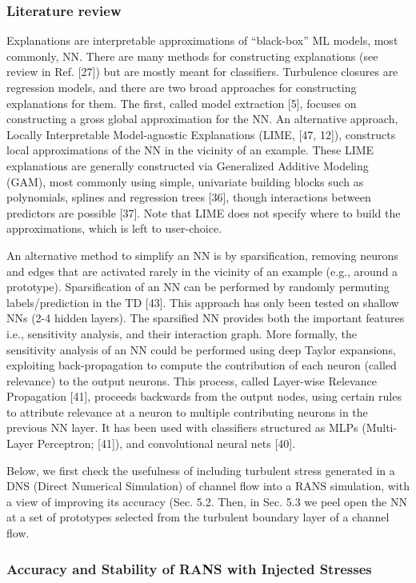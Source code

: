 \subsubsection{Literature review}
Explanations are interpretable approximations of “black-box” ML models, most
commonly, NN. There are many methods for constructing explanations (see review in Ref. [27]) but are
mostly meant for classiﬁers. Turbulence closures are regression models, and there are two broad
approaches for constructing explanations for them. The ﬁrst, called model extraction [5], focuses on
constructing a gross global approximation for the NN. An alternative approach, Locally Interpretable
Model-agnostic Explanations (LIME, [47, 12]), constructs local approximations of the NN in the vicinity
of an example. These LIME explanations are generally constructed via Generalized Additive Modeling
(GAM), most commonly using simple, univariate building blocks such as polynomials, splines and
regression trees [36], though interactions between predictors are possible [37]. Note that LIME does not
specify where to build the approximations, which is left to user-choice.

An alternative method to simplify an NN is by sparsiﬁcation, removing neurons and edges that are
activated rarely in the vicinity of an example (e.g., around a prototype). Sparsiﬁcation of an NN can be
performed by randomly permuting labels/prediction in the TD [43]. This approach has only been tested on
shallow NNs (2-4 hidden layers). The sparsiﬁed NN provides both the important features i.e., sensitivity
analysis, and their interaction graph. More formally, the sensitivity analysis of an NN could be performed
using deep Taylor expansions, exploiting back-propagation to compute the contribution of each neuron
(called relevance) to the output neurons. This process, called Layer-wise Relevance Propagation [41],
proceeds backwards from the output nodes, using certain rules to attribute relevance at a neuron to multiple
contributing neurons in the previous NN layer. It has been used with classiﬁers structured as MLPs
(Multi-Layer Perceptron; [41]), and convolutional neural nets [40].

Below, we ﬁrst check the usefulness of including turbulent stress generated in a DNS (Direct Numerical
Simulation) of channel ﬂow into a RANS simulation, with a view of improving its accuracy (Sec. 5.2.
Then, in Sec. 5.3 we peel open the NN at a set of prototypes selected from the turbulent boundary layer of a channel ﬂow.

\subsubsection{Accuracy and Stability of RANS with Injected Stresses}

